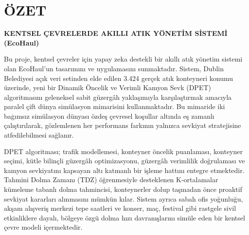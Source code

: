 \documentclass[12pt,a4paper]{report}
\begin{document}
\clearpage
\chapter*{ÖZET}

\begin{center}
{\large\bfseries KENTSEL \c{C}EVRELERDE AKILLI ATIK Y\"ONET\.{I}M S\.{I}STEM\.{I} (EcoHaul)}
\end{center}
\vspace{0.8cm}

\indent Bu proje, kentsel \c{c}evreler i\c{c}in yapay zeka destekli bir ak\i{}ll\i{} at\i{}k y\"onetim sistemi olan EcoHaul'un tasar\i{}m\i{}n\i{} ve uygulamas\i{}n\i{} sunmaktad\i{}r. Sistem, Dublin Belediyesi a\c{c}\i{}k veri setinden elde edilen 3.424 ger\c{c}ek at\i{}k konteyneri konumu \"uzerinde, yeni bir Dinamik \"Oncelik ve Verimli Kamyon Sevk (DPET) algoritmas\i{}n\i{} geleneksel sabit g\"uzerg\^ah yakla\c{s}\i{}m\i{}yla kar\c{s}\i{}la\c{s}t\i{}rmak amac\i{}yla paralel \c{c}ift d\"unya sim\"ulasyon mimarisini kullanmaktad\i{}r. Bu mimaride iki ba\c{g}\i{}ms\i{}z sim\"ulasyon d\"unyas\i{} \"ozde\c{s} \c{c}evresel ko\c{s}ullar alt\i{}nda e\c{s} zamanl\i{} \c{c}al\i{}\c{s}t\i{}r\i{}larak, g\"ozlemlenen her performans fark\i{}n\i{}n yaln\i{}zca sevkiyat stratejisine atfedilebilmesi sa\u{g}lan\i{}r.

\indent DPET algoritmas\i{}; trafik modellemesi, konteyner \"oncelik puanlamas\i{}, konteyner se\c{c}imi, k\"utle bilin\c{c}li g\"uzerg\^ah optimizasyonu, g\"uzerg\^ah verimlilik do\u{g}rulamas\i{} ve kamyon sevkiyat\i{}n\i{} kapsayan alt\i{} katmanl\i{} bir i\c{s}leme hatt\i{}n\i{} entegre etmektedir. Tahmini Dolma Zaman\i{} (TDZ) \"o\u{g}renmesiyle desteklenen K-ortalamalar k\"umeleme tabanl\i{} dolma tahmincisi, konteynerler dolup ta\c{s}madan \"once proaktif sevkiyat kararlar\i{} al\i{}nmas\i{}n\i{} m\"umk\"un k\i{}lar. Sistem ayr\i{}ca sabah ofis yo\u{g}unlu\u{g}u, ak\c{s}am al\i{}\c{s}veri\c{s} merkezi tepe saatleri ve konser, ma\c{c}, festival gibi rastgele sivil etkinliklere dayal\i{}, b\"olgeye \"ozg\"u dolma h\i{}z\i{} davran\i{}\c{s}lar\i{}n\i{} sim\"ule eden bir kentsel \c{c}evre modeli i\c{c}ermektedir.
\end{document}

